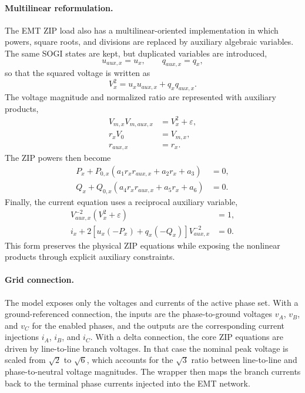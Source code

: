 \paragraph{Multilinear reformulation.}
The EMT ZIP load also has a multilinear-oriented implementation in which powers, square roots, and divisions are replaced by auxiliary algebraic variables. The same SOGI states are kept, but duplicated variables are introduced,
\begin{equation}
    u_{aux,x}=u_x, \qquad q_{aux,x}=q_x,
\end{equation}
so that the squared voltage is written as
\begin{equation}
    V_x^2 = u_x u_{aux,x}+q_x q_{aux,x}.
\end{equation}
The voltage magnitude and normalized ratio are represented with auxiliary products,
\begin{align}
    V_{m,x} V_{m,aux,x} &= V_x^2+\varepsilon, \\
    r_x V_0 &= V_{m,x}, \\
    r_{aux,x} &= r_x.
\end{align}
The ZIP powers then become
\begin{align}
    P_x + P_{0,x}\left(a_1 r_x r_{aux,x}+a_2 r_x+a_3\right) &= 0, \\
    Q_x + Q_{0,x}\left(a_4 r_x r_{aux,x}+a_5 r_x+a_6\right) &= 0.
\end{align}
Finally, the current equation uses a reciprocal auxiliary variable,
\begin{align}
    V^{-2}_{aux,x}\left(V_x^2+\varepsilon\right) &= 1, \\
    i_x + 2\left[u_x\left(-P_x\right)+q_x\left(-Q_x\right)\right]V^{-2}_{aux,x} &= 0.
\end{align}
This form preserves the physical ZIP equations while exposing the nonlinear products through explicit auxiliary constraints.

\paragraph{Grid connection.}
The model exposes only the voltages and currents of the active phase set. With a ground-referenced connection, the inputs are the phase-to-ground voltages $v_A$, $v_B$, and $v_C$ for the enabled phases, and the outputs are the corresponding current injections $i_A$, $i_B$, and $i_C$. With a delta connection, the core ZIP equations are driven by line-to-line branch voltages. In that case the nominal peak voltage is scaled from $\sqrt{2}$ to $\sqrt{6}$, which accounts for the $\sqrt{3}$ ratio between line-to-line and phase-to-neutral voltage magnitudes. The wrapper then maps the branch currents back to the terminal phase currents injected into the EMT network.

